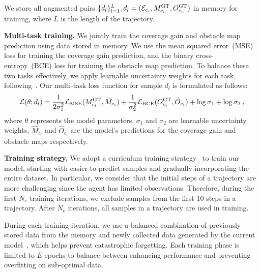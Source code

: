 We store all augmented pairs $\{d_l\}_{l=1}^{L}, d_l = {(\mathcal{E}_{c_i}, M_{c_i}^\text{GT}, O_{c_i}^{\text{GT}})}$ in memory for training, where $L$ is the length of the trajectory.

\noindent \textbf{Multi-task training.}
We jointly train the coverage gain and obstacle map prediction using data stored in memory. 
We use the mean squared error~(MSE) loss for training the coverage gain prediction, and the binary cross-entropy~(BCE) loss for training the obstacle map prediction.
To balance these two tasks effectively, we apply learnable uncertainty weights for each task, following~\cite{multi-weights}. Our multi-task loss function for sample $d_l$ is formulated as follows:
%
\begin{equation}
    {\cal L}{(\theta;d_l)} = 
    \frac{1}{2\sigma_1^2} {\cal L}_{\text{MSE}}(M_{c_i}^{\text{GT}}, \hat{M}_{c_i}) + 
    \frac{1}{\sigma_2^2} {\cal L}_{\text{BCE}}(O_{c_i}^{\text{GT}}, \hat{O}_{c_i}) + 
    \log \sigma_1 + \log \sigma_2 \> ,
    \label{eqn:training_loss}
\end{equation}
%
where $\theta$ represents the model parameters, $\sigma_1$ and $\sigma_2$ are learnable uncertainty weights, $\hat{M}_{c_i}$ and $\hat{O}_{c_i}$ are the model's predictions for the coverage gain and obstacle maps respectively.

\noindent \textbf{Training strategy.}
%
We adopt a curriculum training strategy~\citep{JMLR:v18:16-212, yuan2022easy, yan2021continual, de2021continualsurvey} to train our model, starting with easier-to-predict samples and gradually incorporating the entire dataset. 
In particular, we consider that the initial steps of a trajectory are more challenging since the agent has limited observations. 
Therefore, during the first $N_e$ training iterations, we exclude samples from the first 10 steps in a trajectory. After $N_e$ iterations, all samples in a trajectory are used in training.

During each training iteration, we use a balanced combination of previously stored data from the memory and newly collected data generated by the current model~\citep{wulfmeier2018incremental, memoryreplay, rolnick2019experience, aljundi2019online}, which helps prevent catastrophic forgetting. Each training phase is limited to $E$ epochs to balance between enhancing performance and preventing overfitting on sub-optimal data.



